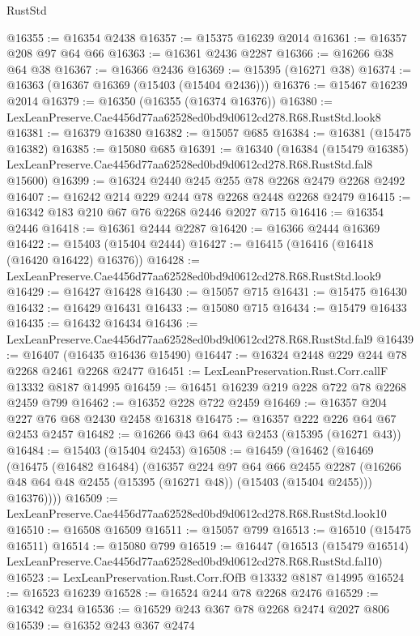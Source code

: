 \begin{lexlean}{RustStd}
\begin{coremodule}
@16355 := @16354 @2438
@16357 := @15375 @16239 @2014
@16361 := @16357 @208 @97 @64 @66
@16363 := @16361 @2436 @2287
@16366 := @16266 @38 @64 @38
@16367 := @16366 @2436
@16369 := @15395 (@16271 @38)
@16374 := @16363 (@16367 @16369 (@15403 (@15404 @2436)))
@16376 := @15467 @16239 @2014
@16379 := @16350 (@16355 (@16374 @16376))
@16380 := LexLeanPreserve.Cae4456d77aa62528ed0bd9d0612cd278.R68.RustStd.look8
@16381 := @16379 @16380
@16382 := @15057 @685
@16384 := @16381 (@15475 @16382)
@16385 := @15080 @685
@16391 := @16340
    (@16384
      (@15479 @16385)
      LexLeanPreserve.Cae4456d77aa62528ed0bd9d0612cd278.R68.RustStd.fal8
      @15600)
@16399 := @16324 @2440 @245 @255 @78 @2268 @2479 @2268 @2492
@16407 := @16242 @214 @229 @244 @78 @2268 @2448 @2268 @2479
@16415 := @16342 @183 @210 @67 @76 @2268 @2446 @2027 @715
@16416 := @16354 @2446
@16418 := @16361 @2444 @2287
@16420 := @16366 @2444 @16369
@16422 := @15403 (@15404 @2444)
@16427 := @16415 (@16416 (@16418 (@16420 @16422) @16376))
@16428 := LexLeanPreserve.Cae4456d77aa62528ed0bd9d0612cd278.R68.RustStd.look9
@16429 := @16427 @16428
@16430 := @15057 @715
@16431 := @15475 @16430
@16432 := @16429 @16431
@16433 := @15080 @715
@16434 := @15479 @16433
@16435 := @16432 @16434
@16436 := LexLeanPreserve.Cae4456d77aa62528ed0bd9d0612cd278.R68.RustStd.fal9
@16439 := @16407 (@16435 @16436 @15490)
@16447 := @16324 @2448 @229 @244 @78 @2268 @2461 @2268 @2477
@16451 := LexLeanPreservation.Rust.Corr.callF @13332 @8187 @14995
@16459 := @16451 @16239 @219 @228 @722 @78 @2268 @2459 @799
@16462 := @16352 @228 @722 @2459
@16469 := @16357 @204 @227 @76 @68 @2430 @2458 @16318
@16475 := @16357 @222 @226 @64 @67 @2453 @2457
@16482 := @16266 @43 @64 @43 @2453 (@15395 (@16271 @43))
@16484 := @15403 (@15404 @2453)
@16508 := @16459
    (@16462
      (@16469
        (@16475
          (@16482 @16484)
          (@16357
            @224
            @97
            @64
            @66
            @2455
            @2287
            (@16266 @48 @64 @48 @2455 (@15395 (@16271 @48)) (@15403 (@15404 @2455)))
            @16376))))
@16509 := LexLeanPreserve.Cae4456d77aa62528ed0bd9d0612cd278.R68.RustStd.look10
@16510 := @16508 @16509
@16511 := @15057 @799
@16513 := @16510 (@15475 @16511)
@16514 := @15080 @799
@16519 := @16447
    (@16513 (@15479 @16514) LexLeanPreserve.Cae4456d77aa62528ed0bd9d0612cd278.R68.RustStd.fal10)
@16523 := LexLeanPreservation.Rust.Corr.fOfB @13332 @8187 @14995
@16524 := @16523 @16239
@16528 := @16524 @244 @78 @2268 @2476
@16529 := @16342 @234
@16536 := @16529 @243 @367 @78 @2268 @2474 @2027 @806
@16539 := @16352 @243 @367 @2474

\end{coremodule}
\end{lexlean}
